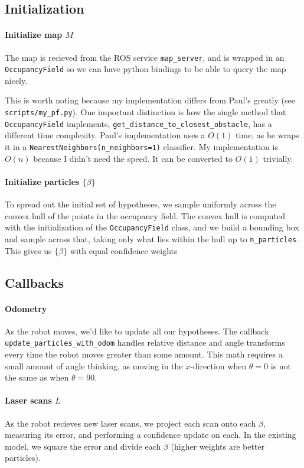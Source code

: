\documentclass[]{article}
\begin{document}
\subsection{Initialization}
\paragraph{Initialize map $M$}
The map is recieved from the ROS service \verb|map_server|, and is wrapped in an \verb|OccupancyField| so we can have python bindings to be able to query the map nicely. 

This is worth noting because my implementation differs from Paul's greatly (see \verb|scripts/my_pf.py|). One important distinction is how the single method that \verb|OccupancyField| implements, \verb|get_distance_to_closest_obstacle|, has a different time complexity. Paul's implementation uses a $O(1)$ time, as he wraps it in a \verb|NearestNeighbors(n_neighbors=1)| classifier. My implementation is $O(n)$ because I didn't need the speed. It can be converted to $O(1)$ trivially.
\paragraph{Initialize particles $\{\beta\}$}
To spread out the initial set of hypotheses, we sample uniformly across the convex hull of the points in the occupancy field. The convex hull is computed with the initialization of the \verb|OccupancyField| class, and we build a bounding box and sample across that, taking only what lies within the hull up to \verb|n_particles|. This gives us $\{\beta\}$ with equal confidence weights
\subsection{Callbacks}
\paragraph{Odometry}
As the robot moves, we'd like to update all our hypotheses. The callback \verb|update_particles_with_odom| handles relative distance and angle transforms every time the robot moves greater than some amount. This math requires a small amount of angle thinking, as moving in the $x$-direction when $\theta = 0$ is not the same as when $\theta = 90$.
\paragraph{Laser scans $L$}
As the robot recieves new laser scans, we project each scan onto each $\beta$, measuring its error, and performing a confidence update on each. In the existing model, we square the error and divide each $\beta$ (higher weights are better particles). 
\end{document}
